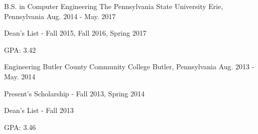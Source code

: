 

\begin{cventries}

  \cventry
    {B.S. in Computer Engineering} %
    {The Pennsylvania State University} %
    {Erie, Pennsylvania} %
    {Aug. 2014 - May. 2017} %
    {
      \begin{cvitems} %
        \item {Dean's List - Fall 2015, Fall 2016, Spring 2017}
        \item {GPA: 3.42}
      \end{cvitems}
    }

  \cventry
    {Engineering} %
    {Butler County Community College} %
    {Butler, Pennsylvania} %
    {Aug. 2013 - May. 2014} %
    {
      \begin{cvitems} %
        \item {Present's Scholarship - Fall 2013, Spring 2014}
        \item {Dean's List - Fall 2013}
        \item {GPA: 3.46}
      \end{cvitems}
    }

\end{cventries}
